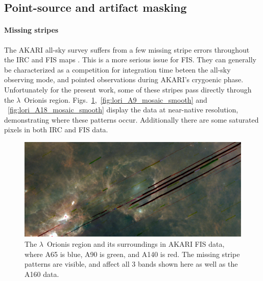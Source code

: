       \subsection{Point-source and artifact masking}

        \paragraph{Missing stripes}
          The AKARI all-sky survey suffers from a few missing stripe errors throughout the IRC and FIS maps \citep{ishihara10, doi15}. This is a more serious issue for FIS. They can generally be characterized as a competition for integration time beteen the all-sky observing mode, and pointed observations during AKARI's crygoenic phase. Unfortunately for the present work, some of these stripes pass directly through the $\lambda$~Orionis region. Figs.~\ref{fig:LOri_FIS_color},~\ref{fig:lori_A9_mosaic_smooth} and ~\ref{fig:lori_A18_mosaic_smooth} display the data at near-native resolution, demonstrating where these patterns occur. Additionally there are some saturated pixels in both IRC and FIS data.
            \begin{figure}
              \includegraphics[width=\textwidth]{../Plots/ch_lori/lori_fis_rgb.pdf}
              \centering
              \caption{The $\lambda$~Orionis region and its surroundings in AKARI FIS data, where A65 is blue, A90 is green, and A140 is red. The missing stripe patterns are visible, and affect all 3 bands shown here as well as the A160 data. }
              \label{fig:LOri_FIS_color}
            \end{figure}
